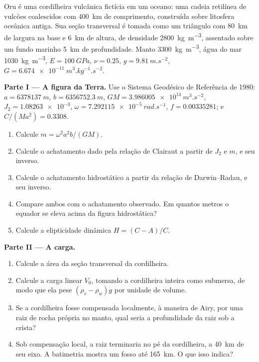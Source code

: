 \begin{problem}
\label{pb:b3:gravity-geodesy:1}
Oru é uma cordilheira vulcânica fictícia em um oceano: uma cadeia retilínea de vulcões coalescidos
com \qty{400}{km} de comprimento, construída sobre litosfera oceânica antiga. Sua
seção transversal é tomada como um triângulo com \qty{80}{km} de largura na base e
\qty{6}{km} de altura, de densidade \qty{2800}{kg.m^{-3}}, assentado sobre um fundo marinho
\qty{5}{km} de profundidade. Manto \qty{3300}{kg.m^{-3}}, água do mar
\qty{1030}{kg.m^{-3}}, $E = \qty{100}{GPa}$, $\nu = 0.25$, $g =
\qty{9.81}{m.s^{-2}}$, $G = \qty{6.674e-11}{m^3.kg^{-1}.s^{-2}}$.

\medskip
\noindent\textbf{Parte I --- A figura da Terra.} Use o Sistema Geodésico de Referência
de 1980: $a = \qty{6378137}{m}$, $b = \qty{6356752.3}{m}$,
$GM = \qty{3.986005e14}{m^3.s^{-2}}$, $J_2 = \num{1.08263e-3}$,
$\omega = \qty{7.292115e-5}{rad.s^{-1}}$, $f = \num{0.00335281}$; e
$C/(Ma^2) = \num{0.3308}$.
\begin{enumerate}
  \item Calcule $m = \omega^2a^2b/(GM)$.
  \item Calcule o achatamento dado pela relação de Clairaut a partir de $J_2$ e
        $m$, e seu inverso.
  \item Calcule o achatamento hidrostático a partir da relação de Darwin--Radau, e
        seu inverso.
  \item Compare ambos com o achatamento observado. Em quantos metros o
        equador se eleva acima da figura hidrostática?
  \item Calcule a elipticidade dinâmica $H = (C - A)/C$.
\end{enumerate}

\noindent\textbf{Parte II --- A carga.}
\begin{enumerate}[resume]
  \item Calcule a área da seção transversal da cordilheira.
  \item Calcule a carga linear $V_0$, tomando a cordilheira inteira como submersa, de modo
        que ela pese $(\rho_v - \rho_w)g$ por unidade de volume.
  \item Se a cordilheira fosse compensada localmente, à maneira de Airy, por uma raiz de
        rocha própria no manto, qual seria a profundidade da raiz sob a
        crista?
  \item Sob compensação local, a raiz terminaria no pé da cordilheira,
        a \qty{40}{km} de seu eixo. A batimetria mostra um fosso até
        \qty{165}{km}. O que isso indica?
\end{enumerate}


\end{problem}
